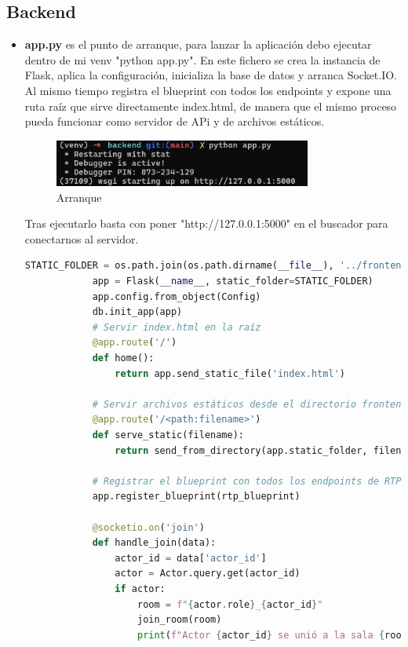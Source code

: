 \subsection{Backend}
\label{subsubsec:Backend}

\begin{itemize}
    \item \textbf{app.py} es el punto de arranque, para lanzar la aplicación debo ejecutar dentro de mi venv "python app.py". En este fichero se crea la instancia de Flask, aplica la configuración, inicializa la base de datos y arranca Socket.IO. Al mismo tiempo registra el blueprint con todos los endpoints y expone una ruta raíz que sirve directamente index.html, de manera que el mismo proceso pueda funcionar como servidor de APi y de archivos estáticos. 
        \begin{figure}[H]
            \centering
            \includegraphics[width=0.8\textwidth]{Imagenes/Arranque1.png}
            \caption{Arranque}
            \label{fig:Arranque}
        \end{figure}
        Tras ejecutarlo basta con poner "http://127.0.0.1:5000"     en el buscador para conectarnos al servidor.


        \begin{lstlisting}[language=Python, style=custom, caption={Configuración y arranque del servidor Flask-SocketIO}]
            STATIC_FOLDER = os.path.join(os.path.dirname(__file__), '../frontend')
            app = Flask(__name__, static_folder=STATIC_FOLDER)
            app.config.from_object(Config)
            db.init_app(app)
            # Servir index.html en la raíz
            @app.route('/')
            def home():
                return app.send_static_file('index.html')

            # Servir archivos estáticos desde el directorio frontend
            @app.route('/<path:filename>')
            def serve_static(filename):
                return send_from_directory(app.static_folder, filename)

            # Registrar el blueprint con todos los endpoints de RTP
            app.register_blueprint(rtp_blueprint)

            @socketio.on('join')
            def handle_join(data):
                actor_id = data['actor_id']
                actor = Actor.query.get(actor_id)
                if actor:
                    room = f"{actor.role}_{actor_id}"
                    join_room(room)
                    print(f"Actor {actor_id} se unió a la sala {room}")


\end{lstlisting}
\end{itemize}
